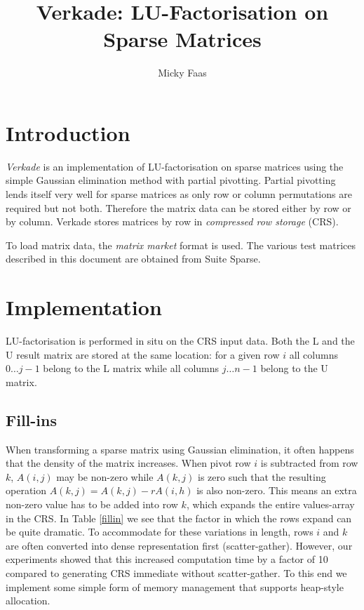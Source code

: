 \documentclass[10pt,a4paper]{article}
\author{Micky Faas}
\begin{document}
\title{Verkade: LU-Factorisation on Sparse Matrices}
\maketitle
\section{Introduction}
\emph{Verkade} is an implementation of LU-factorisation on sparse matrices using the simple Gaussian elimination method with partial pivotting. Partial pivotting lends itself very well for sparse matrices as only row or column permutations are required but not both. Therefore the matrix data can be stored either by row or by column. Verkade stores matrices by row in \emph{compressed row storage} (CRS)\cite{crs}.

To load matrix data, the \emph{matrix market} format\cite{mm} is used. The various test matrices described in this document are obtained from Suite Sparse\cite{suitesparse}.

\section{Implementation}

LU-factorisation is performed in situ on the CRS input data. Both the L and the U result matrix are stored at the same location: for a given row $i$ all columns $0\dots{j-1}$ belong to the L matrix while all columns $j\dots{n-1}$ belong to the U matrix. 

\subsection{Fill-ins}

When transforming a sparse matrix using Gaussian elimination, it often happens that the density of the matrix increases. When pivot row $i$ is subtracted from row $k$, $A(i,j)$ may be non-zero while $A(k,j)$ is zero such that the resulting operation $A(k,j)=A(k,j)-rA(i,h)$ is also non-zero. This means an extra non-zero value has to be added into row $k$, which expands the entire values-array in the CRS. In Table \ref{fillin} we see that the factor in which the rows expand can be quite dramatic. To accommodate for these variations in length, rows $i$ and $k$ are often converted into dense representation first (scatter-gather). However, our experiments showed that this increased computation time by a factor of 10 compared to generating CRS immediate without scatter-gather. To this end we implement some simple form of memory management that supports heap-style allocation.
\end{document}
